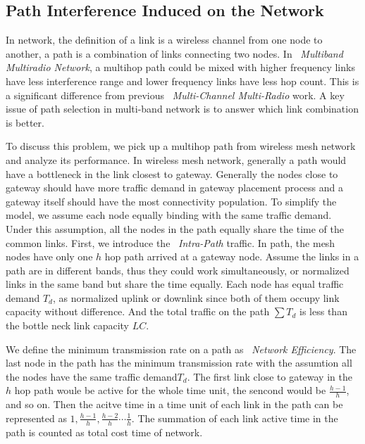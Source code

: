 \subsection{Path Interference Induced on the Network}
\label{subsec:PEN}

In network, the definition of a link is a wireless channel from one node to another, a path is a combination of links connecting two nodes.
In ~\emph{Multiband Multiradio Network}, 
a multihop path could be mixed with higher frequency links have less interference range and lower frequency links have less hop count. This is a significant difference from previous ~\emph{Multi-Channel Multi-Radio} work. 
A key issue of path selection in multi-band network is to answer which link combination is better.

To discuss this problem, we pick up a multihop path from wireless mesh network and analyze its performance. In wireless mesh network, generally a path would have a bottleneck in the link closest to gateway.
Generally the nodes close to gateway should have more traffic demand in gateway placement process and a gateway itself should have the most connectivity population. 
To simplify the model, we assume each node equally binding with the same traffic demand.
Under this assumption, all the nodes in the path equally share the time of the common links. 
First, we introduce the ~\emph{Intra-Path} traffic. In path, the mesh nodes have only one $h$ hop path arrived at a gateway node.
Assume the links in a path are in different bands, thus they could work simultaneously, or normalized links in the same band but share the time equally.
Each node has equal traffic demand $T_d$, as normalized uplink or downlink since both of them occupy link capacity without difference. And the total traffic on the path $\sum T_d$ is less than the bottle neck link capacity $LC$. 

We define the minimum transmission rate on a path as ~\emph{Network Efficiency}. 
The last node in the path has the minimum transmission rate with the assumtion all the nodes have the same traffic demand$T_d$.
The first link close to gateway in the $h$ hop path woule be active for the whole time unit, the sencond would be $\frac{h-1}{h}$, and so on.
Then the acitve time in a time unit of each link in the path can be represented as $1,\frac{h-1}{h},\frac{h-2}{h}\cdots \frac{1}{h}$. 
The summation of each link active time in the path is counted as total cost time of network.


